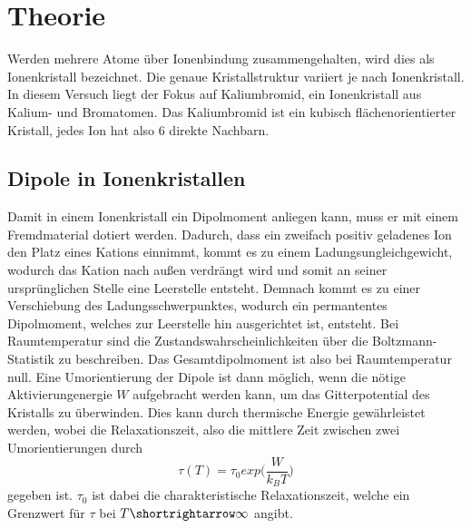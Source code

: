 \section{Theorie}
\label{sec:Theorie}

Werden mehrere Atome über Ionenbindung zusammengehalten, wird dies als Ionenkristall bezeichnet. Die genaue Kristallstruktur variiert je nach Ionenkristall.
In diesem Versuch liegt der Fokus auf Kaliumbromid, ein Ionenkristall aus Kalium- und Bromatomen. Das Kaliumbromid ist ein kubisch flächenorientierter Kristall,
jedes Ion hat also 6 direkte Nachbarn. 

\subsection{Dipole in Ionenkristallen}

Damit in einem Ionenkristall ein Dipolmoment anliegen kann, muss er mit einem Fremdmaterial dotiert werden. Dadurch, dass ein zweifach positiv geladenes Ion den Platz eines 
Kations einnimmt, kommt es zu einem Ladungsungleichgewicht, wodurch das Kation nach außen verdrängt wird und somit an seiner ursprünglichen Stelle eine Leerstelle entsteht.
Demnach kommt es zu einer Verschiebung des Ladungsschwerpunktes, wodurch ein permantentes Dipolmoment, welches zur Leerstelle hin ausgerichtet ist, entsteht. 
Bei Raumtemperatur sind die Zustandswahrscheinlichkeiten über die Boltzmann-Statistik zu beschreiben. Das Gesamtdipolmoment ist also bei Raumtemperatur null. 
Eine Umorientierung der Dipole ist dann möglich, wenn die nötige Aktivierungenergie $W$ aufgebracht werden kann, um das Gitterpotential des Kristalls zu überwinden. 
Dies kann durch thermische Energie gewährleistet werden, wobei die Relaxationszeit, also die mittlere Zeit zwischen zwei Umorientierungen durch 
\begin{equation}
    \tau(T) = \tau_0 exp \bigl( \frac{W}{k_B T}\bigr)
\end{equation}
gegeben ist. $\tau_0 $ ist dabei die charakteristische Relaxationszeit, welche ein Grenzwert für $\tau$ bei $T\shortrightarrow\infty$ angibt.